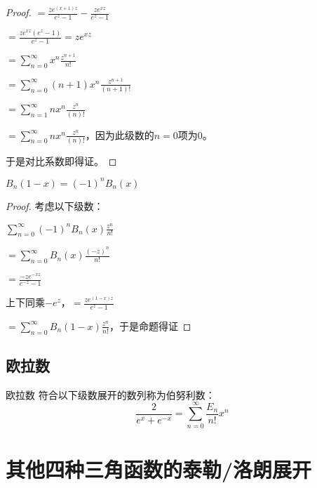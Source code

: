 \documentclass[12pt, a4paper, oneside, UTF8]{ctexbook}
\begin{document}
\begin{para}{0}
\begin{para}{1}
\begin{proof}
					$=\frac{z e^{(x+1)z}}{e^z-1}-\frac{z e^{xz}}{e^z-1}$
					
					$=\frac{z e^{xz} (e^z-1)}{e^z-1} = z e^{xz}$
					
					$=\sum\limits_{n=0}^{\infty} x^n \frac{z^{n+1}}{n!}$
					
					$=\sum\limits_{n=0}^{\infty} (n+1)x^n \frac{z^{n+1}}{(n+1)!}$
					
					$=\sum\limits_{n=1}^{\infty} n x^n \frac{z^{n}}{(n)!}$
					
					$=\sum\limits_{n=0}^{\infty} n x^n \frac{z^{n}}{(n)!}$，因为此级数的$n=0$项为0。
					
					于是对比系数即得证。
				\end{proof}
				\point{}
				\begin{proposition}
					$B_n (1-x) = (-1)^n B_n(x)$
				\end{proposition}
				\begin{proof}
					考虑以下级数：
					
					$\sum\limits_{n=0}^{\infty} (-1)^n B_n(x) \frac{z^n}{n!}$
					
					$=\sum\limits_{n=0}^{\infty} B_n(x) \frac{(-z)^n}{n!}$
					
					$=\frac{-z e^{-xz}}{e^{-z}-1}$
					
					上下同乘$-e^z$，$=\frac{z e^{(1-x)z}}{e^z-1}$
					
					$=\sum\limits_{n=0}^{\infty} B_n(1-x) \frac{z^n}{n!}$，于是命题得证
				\end{proof}
			\end{para}
		\end{para}
		\subsection{欧拉数}
			\begin{para}{0}
					\begin{defn}{欧拉数}
						符合以下级数展开的数列称为伯努利数：
						\begin{equation}
							\frac{2}{e^x +e^{-x}} = \sum_{n=0}^{\infty}\frac{E_n}{n!}x^n
						\end{equation}
					\end{defn}
			\end{para}
	\section{其他四种三角函数的泰勒/洛朗展开}
\end{document}
